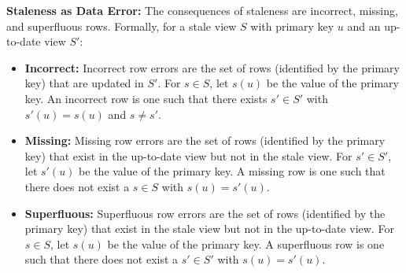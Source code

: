 \noindent \textbf{Staleness as Data Error: } The consequences of staleness are incorrect, missing, and superfluous rows. 
Formally, for a stale view $S$ with primary key $u$ and an up-to-date view $S'$:
\begin{itemize}[noitemsep] \sloppy
	\item \textbf{Incorrect: } Incorrect row errors are the set of rows (identified by the primary key) that are updated in $S'$. For $s \in S$, let $s(u)$ be the value of the primary key. An incorrect row is one such that there exists $s' \in S'$ with $s'(u) = s(u)$ and $s \ne s'$.
	\item \textbf{Missing: } Missing row errors are the set of rows (identified by the primary key) that exist in the up-to-date view but not in the stale view. For $s' \in S'$, let $s'(u)$ be the value of the primary key. A missing row is one such that there does not exist a $s \in S$ with $s(u) = s'(u)$.
	\item \textbf{Superfluous: } Superfluous row errors are the set of rows (identified by the primary key) that exist in the stale view but not in the up-to-date view. For $s \in S$, let $s(u)$ be the value of the primary key. A superfluous row is one such that there does not exist a $s' \in S'$ with $s(u) = s'(u)$.
\end{itemize}

\vspace{.25em}

